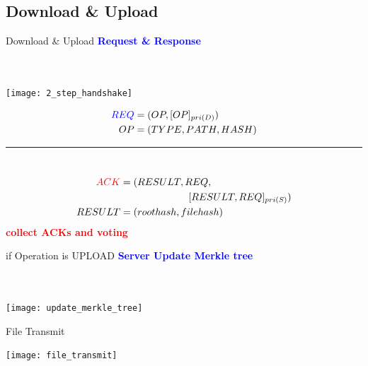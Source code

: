 \documentclass{beamer}
\newcommand{\tab}[1]{\hspace{.1\textwidth}\rlap{#1}}
\newcommand{\divider}[1]{\noindent\rule{.9\textwidth}{1pt}}
\begin{document}
\begin{CJK}{UTF8}{bkai}
\subsection{Download \& Upload}
\begin{frame}{Download \& Upload}
	\centering
	\textcolor{blue}{\textbf{Request \& Response}}\\
	~\\
	~\\
	\begin{minipage}{.45\textwidth}
        \texttt{[image: 2\_step\_handshake]}
    \end{minipage}%
	\begin{minipage}{.55\textwidth}
    	\footnotesize
		\centering
		\begin{equation} \label{eq1}
                \begin{split}
                        \textcolor{blue}{REQ} & = (OP, [OP]_{pri(D)}) \\
                        OP & = (TYPE, PATH, HASH) \\
                \end{split}
        \end{equation}
        \divider{}\\
        \begin{equation} \label{eq2}
                \begin{split}
                        \textcolor{red}{ACK} & = (RESULT, REQ,\\
                        & \tab{}\tab{}[RESULT, REQ]_{pri(S)}) \\
                        RESULT & = (roothash, filehash)
                \end{split}
        \end{equation}
        \textcolor{red}{\textbf{collect ACKs and voting}}
    \end{minipage}%
\end{frame}

\begin{frame}{if Operation is UPLOAD}
	\centering
	\textcolor{blue}{\textbf{Server Update Merkle tree}}\\
	~\\
	~\\
	\begin{center}
		\texttt{[image: update\_merkle\_tree]}
	\end{center}
\end{frame}

\begin{frame}{File Transmit}
	\begin{center}
		\texttt{[image: file\_transmit]}
	\end{center}
\end{frame}


\end{CJK}
\end{document}
